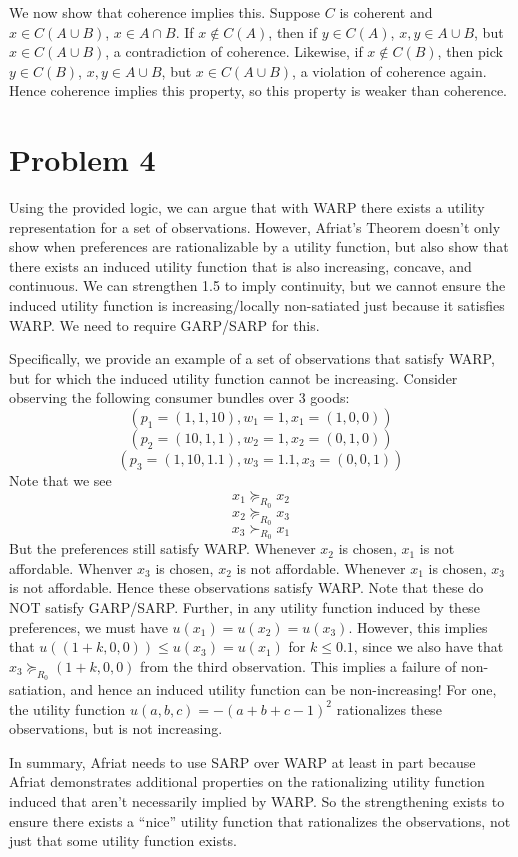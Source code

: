 \documentclass[10pt,letter]{article}
\begin{document}
We now show that coherence implies this. Suppose $C$ is coherent and $x \in C(A \cup B)$, $x \in A \cap B$. If $x \not \in C(A)$, then if $y \in C(A)$, $x, y \in A \cup B$, but $x \in C(A\cup B)$, a contradiction of coherence. Likewise, if $x \not \in C(B)$, then pick $y \in C(B)$, $x, y \in A \cup B$, but $x \in C(A\cup B)$, a violation of coherence again. Hence coherence implies this property, so this property is weaker than coherence.
\section*{Problem 4}
Using the provided logic, we can argue that with WARP there exists a utility representation for a set of observations. However, Afriat's Theorem doesn't only show when preferences are rationalizable by a utility function, but also show that there exists an induced utility function that is also increasing, concave, and continuous. We can strengthen 1.5 to imply continuity, but we cannot ensure the induced utility function is increasing/locally non-satiated just because it satisfies WARP. We need to require GARP/SARP for this.

 Specifically, we provide an example of a set of observations that satisfy WARP, but for which the induced utility function cannot be increasing. Consider observing the following consumer bundles over 3 goods:
\[ (p_1 = (1,1,10), w_1 = 1, x_1=(1,0,0)) \]
\[ (p_2 = (10,1,1), w_2 = 1, x_2=(0,1,0)) \]
\[ (p_3 = (1,10,1.1), w_3 = 1.1, x_3=(0,0,1)) \]
Note that we see
\[ x_1 \succeq_{R_0} x_2 \]
\[ x_2 \succeq_{R_0} x_3 \]
\[ x_3 \succ_{R_0} x_1 \]
But the preferences still satisfy WARP. Whenever $x_2$ is chosen, $x_1$ is not affordable. Whenver $x_3$ is chosen, $x_2$ is not affordable. Whenever $x_1$ is chosen, $x_3$ is not affordable. Hence these observations satisfy WARP. Note that these do NOT satisfy GARP/SARP. Further, in any utility function induced by these preferences, we must have $u(x_1) = u(x_2) = u(x_3)$. However, this implies that $u((1 + k, 0, 0)) \le u(x_3) = u(x_1)$ for $k \le 0.1$, since we also have that $x_3 \succeq_{R_0} (1+k, 0, 0)$ from the third observation. This implies a failure of non-satiation, and hence an induced utility function can be non-increasing! For one, the utility function $u(a, b, c) = -(a+b+c - 1)^2$ rationalizes these observations, but is not increasing.

In summary, Afriat needs to use SARP over WARP at least in part because Afriat demonstrates additional properties on the rationalizing utility function induced that aren't necessarily implied by WARP. So the strengthening exists to ensure there exists a ``nice'' utility function that rationalizes the observations, not just that some utility function exists.
\end{document}
